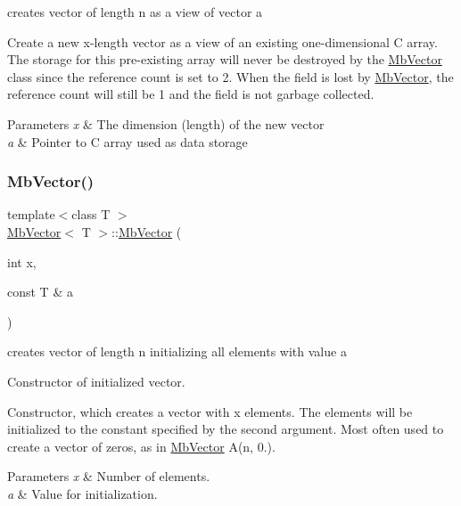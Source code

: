 creates vector of length n as a view of vector a 

Create a new x-\/length vector as a view of an existing one-\/dimensional C array. The storage for this pre-\/existing array will never be destroyed by the \mbox{\hyperlink{class_mb_vector}{Mb\+Vector}} class since the reference count is set to 2. When the field is lost by \mbox{\hyperlink{class_mb_vector}{Mb\+Vector}}, the reference count will still be 1 and the field is not garbage collected.


\begin{DoxyParams}{Parameters}
{\em x} & The dimension (length) of the new vector \\
\hline
{\em a} & Pointer to C array used as data storage \\
\hline
\end{DoxyParams}
\mbox{\label{class_mb_vector_a24fc5dce7588ec1fe94c5456c15b4ff1}} 
\subsubsection{\texorpdfstring{MbVector()}{MbVector()}\hspace{0.1cm}{\footnotesize\ttfamily [4/5]}}
{\footnotesize\ttfamily template$<$class T $>$ \\
\mbox{\hyperlink{class_mb_vector}{Mb\+Vector}}$<$ T $>$\+::\mbox{\hyperlink{class_mb_vector}{Mb\+Vector}} (\begin{DoxyParamCaption}\item[{int}]{x,  }\item[{const T \&}]{a }\end{DoxyParamCaption})}



creates vector of length n initializing all elements with value a 

Constructor of initialized vector.

Constructor, which creates a vector with x elements. The elements will be initialized to the constant specified by the second argument. Most often used to create a vector of zeros, as in \mbox{\hyperlink{class_mb_vector}{Mb\+Vector}} A(n, 0.).


\begin{DoxyParams}{Parameters}
{\em x} & Number of elements. \\
\hline
{\em a} & Value for initialization. \\
\hline
\end{DoxyParams}
\mbox{\label{class_mb_vector_a9170642bc4f080109660df9eb3f713bc}} 
